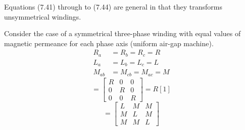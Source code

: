 \documentclass[a4paper,numbers=noenddot,12pt]{scrbook}
\begin{document}
    Equations (7.41) through to (7.44) are general in that they transforms unsymmetrical windings.

    Consider the case of a symmetrical three-phase winding with equal values of magnetic permeance for each phase axis (uniform air-gap machine).
    \begin{equation}
        \begin{aligned}
            R_a & = R_b = R_c = R \\
            L_a & = L_b = L_c = L \\
            M_{ab} & = M_{cb} = M_{ac} = M
        \end{aligned}
    \end{equation}
    \begin{equation}
        [R_{abc}] = 
        \begin{bmatrix}
            R & 0 & 0 \\
            0 & R & 0 \\
            0 & 0 & R
        \end{bmatrix}
        = R[1]
        \label{eq:Eq7.46}
    \end{equation}
    \begin{equation}
        [L_{abc}] = 
        \begin{bmatrix}
            L & M & M \\
            M & L & M \\
            M & M & L
        \end{bmatrix}
        \label{eq:Eq7.47}
    \end{equation}
\end{document}
